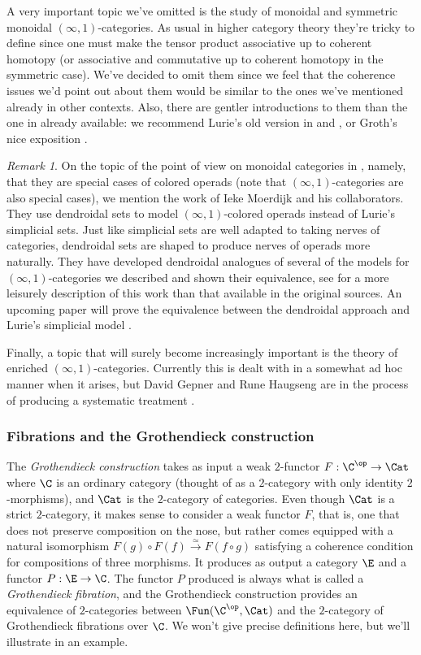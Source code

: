 \documentclass[12pt]{amsart}
\theoremstyle{definition} \newtheorem{definition}[theorem]{Definition}
\theoremstyle{remark} \newtheorem{remark}[theorem]{Remark}
\numberwithin{equation}{section}
\newcommand{\oo}{\infty}
\newcommand{\io}{$(\oo,1)$}
\begin{document}
A very important topic we've omitted is the study of monoidal and
symmetric monoidal \io-categories. As usual in higher category theory
they're tricky to define since one must make the tensor product
associative up to coherent homotopy (or associative and commutative up
to coherent homotopy in the symmetric case). We've decided to omit
them since we feel that the coherence issues we'd point out about them
would be similar to the ones we've mentioned already in other
contexts. Also, there are gentler introductions to them than the one
in \cite{HA} already available: we recommend Lurie's old version in
\cite{DAG2} and \cite{DAG3}, or Groth's nice exposition \cite[Sections
3 and 4]{Groth}.

\begin{remark}
  On the topic of the point of view on monoidal categories in
  \cite{HA}, namely, that they are special cases of colored operads
  (note that \io-categories are also special cases), we mention the
  work of Ieke Moerdijk and his collaborators. They use dendroidal
  sets to model \io-colored operads instead of Lurie's simplicial
  sets. Just like simplicial sets are well adapted to taking nerves of
  categories, dendroidal sets are shaped to produce nerves of operads
  more naturally. They have developed dendroidal analogues of several
  of the models for $(\oo,1)$-categories we described and shown their
  equivalence, see \cite{Ieke} for a more leisurely description of this
  work than that available in the original sources.
  An upcoming paper will prove the equivalence between the dendroidal
  approach and Lurie's simplicial model \cite{Gijs}.
\end{remark}

Finally, a topic that will surely become increasingly important is the
theory of enriched \io-categories. Currently this is dealt with in a
somewhat ad hoc manner when it arises, but David Gepner and Rune
Haugseng are in the process of producing a systematic treatment
\cite{Rune}.


\subsubsection{Fibrations and the Grothendieck construction}

The \emph{Grothendieck construction} takes as input a weak $2$-functor
$F : \C^{\op} \to \Cat$ where $\C$ is an ordinary category (thought of
as a $2$-category with only identity $2$-morphisms), and $\Cat$  is
the $2$-category of categories. Even though $\Cat$ is a strict
$2$-category, it makes sense to consider a weak functor $F$, that is,
one that does not preserve composition on the nose, but rather comes
equipped with a natural isomorphism $F(g) \circ F(f)
\xrightarrow{\simeq} F(f \circ g)$ satisfying a coherence condition
for compositions of three morphisms. It produces as output a category
$\E$ and a functor $P : \E \to \C$. The functor $P$ produced is always
what is called a \emph{Grothendieck fibration}, and the Grothendieck
construction provides an equivalence of $2$-categories between
$\Fun(\C^{\op}, \Cat)$ and the $2$-category of Grothendieck fibrations
over $\C$. We won't give precise definitions here, but we'll
illustrate in an example.
\end{document}
